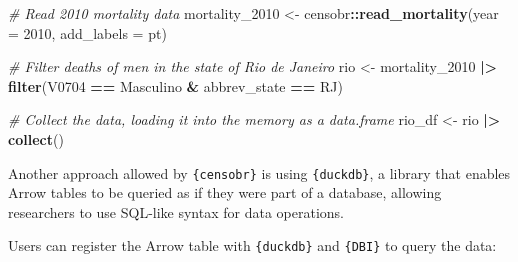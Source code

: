 \documentclass[
]{article}
\newenvironment{Shaded}{\begin{snugshade}}{\end{snugshade}}
\newcommand{\AttributeTok}[1]{\textcolor[rgb]{0.13,0.29,0.53}{#1}}
\newcommand{\CommentTok}[1]{\textcolor[rgb]{0.56,0.35,0.01}{\textit{#1}}}
\newcommand{\DecValTok}[1]{\textcolor[rgb]{0.00,0.00,0.81}{#1}}
\newcommand{\FunctionTok}[1]{\textcolor[rgb]{0.13,0.29,0.53}{\textbf{#1}}}
\newcommand{\NormalTok}[1]{#1}
\newcommand{\OtherTok}[1]{\textcolor[rgb]{0.56,0.35,0.01}{#1}}
\newcommand{\SpecialCharTok}[1]{\textcolor[rgb]{0.81,0.36,0.00}{\textbf{#1}}}
\newcommand{\StringTok}[1]{\textcolor[rgb]{0.31,0.60,0.02}{#1}}
\begin{document}
\begin{Shaded}
\begin{Highlighting}[]
\CommentTok{\# Read 2010 mortality data}
\NormalTok{mortality\_2010 }\OtherTok{\textless{}{-}}\NormalTok{ censobr}\SpecialCharTok{::}\FunctionTok{read\_mortality}\NormalTok{(}\AttributeTok{year =} \DecValTok{2010}\NormalTok{, }\AttributeTok{add\_labels =} \StringTok{\textquotesingle{}pt\textquotesingle{}}\NormalTok{)}

\CommentTok{\# Filter deaths of men in the state of Rio de Janeiro}
\NormalTok{rio }\OtherTok{\textless{}{-}}\NormalTok{ mortality\_2010 }\SpecialCharTok{|\textgreater{}}
  \FunctionTok{filter}\NormalTok{(V0704 }\SpecialCharTok{==} \StringTok{\textquotesingle{}Masculino\textquotesingle{}} \SpecialCharTok{\&}\NormalTok{ abbrev\_state }\SpecialCharTok{==} \StringTok{\textquotesingle{}RJ\textquotesingle{}}\NormalTok{)}

\CommentTok{\# Collect the data, loading it into the memory as a data.frame}
\NormalTok{rio\_df }\OtherTok{\textless{}{-}}\NormalTok{ rio }\SpecialCharTok{|\textgreater{}} \FunctionTok{collect}\NormalTok{()}
\end{Highlighting}
\end{Shaded}

Another approach allowed by \texttt{\{censobr\}} is using
\texttt{\{duckdb\}}, a library that enables Arrow tables to be queried
as if they were part of a database, allowing researchers to use SQL-like
syntax for data operations.

Users can register the Arrow table with \texttt{\{duckdb\}} and
\texttt{\{DBI\}} to query the data:
\end{document}
